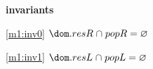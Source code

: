 \textbf{invariants}
\begin{block}
\item[ \eqref{m1:inv0} ]$\dom.resR \binter popR = \emptyset $ %
\item[ \eqref{m1:inv1} ]$\dom.resL \binter popL = \emptyset $ %
\end{block}
